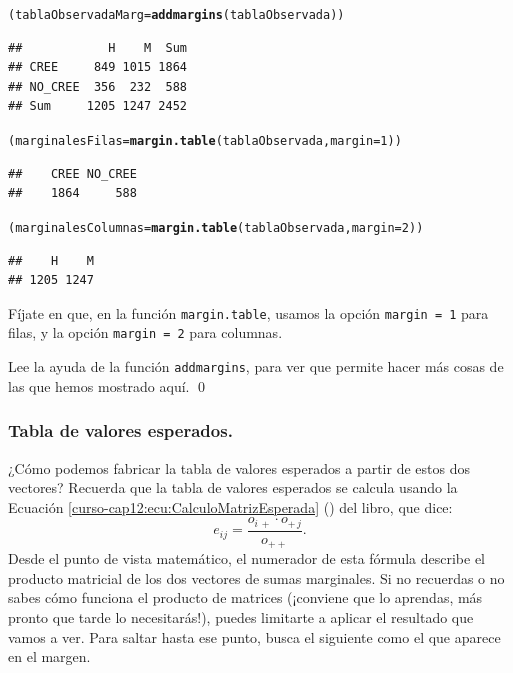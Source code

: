 \documentclass[10pt,a4paper]{article}\usepackage[]{graphicx}\usepackage[]{color}
\makeatletter
\newcommand{\hlnum}[1]{\textcolor[rgb]{0.686,0.059,0.569}{#1}}%
\newcommand{\hlstd}[1]{\textcolor[rgb]{0.345,0.345,0.345}{#1}}%
\newcommand{\hlkwb}[1]{\textcolor[rgb]{0.69,0.353,0.396}{#1}}%
\newcommand{\hlkwc}[1]{\textcolor[rgb]{0.333,0.667,0.333}{#1}}%
\newcommand{\hlkwd}[1]{\textcolor[rgb]{0.737,0.353,0.396}{\textbf{#1}}}%
\newenvironment{kframe}{%
 \def\at@end@of@kframe{}%
 \ifinner\ifhmode%
  \def\at@end@of@kframe{\end{minipage}}%
  \begin{minipage}{\columnwidth}%
 \fi\fi%
 \def\FrameCommand##1{\hskip\@totalleftmargin \hskip-\fboxsep
 \colorbox{shadecolor}{##1}\hskip-\fboxsep
     \hskip-\linewidth \hskip-\@totalleftmargin \hskip\columnwidth}%
 \MakeFramed {\advance\hsize-\width
   \@totalleftmargin\z@ \linewidth\hsize
   \@setminipage}}%
 {\par\unskip\endMakeFramed%
 \at@end@of@kframe}
\newenvironment{knitrout}{}{} %
\makeatother
\begin{document}
\begin{knitrout}
\color{fgcolor}\begin{kframe}
\begin{alltt}
\hlstd{(tablaObservadaMarg} \hlkwb{=} \hlkwd{addmargins}\hlstd{(tablaObservada))}
\end{alltt}
\begin{verbatim}
##            H    M  Sum
## CREE     849 1015 1864
## NO_CREE  356  232  588
## Sum     1205 1247 2452
\end{verbatim}
\begin{alltt}
\hlstd{(marginalesFilas} \hlkwb{=} \hlkwd{margin.table}\hlstd{(tablaObservada,} \hlkwc{margin}\hlstd{=}\hlnum{1}\hlstd{) )}
\end{alltt}
\begin{verbatim}
##    CREE NO_CREE 
##    1864     588
\end{verbatim}
\begin{alltt}
\hlstd{(marginalesColumnas} \hlkwb{=} \hlkwd{margin.table}\hlstd{(tablaObservada,} \hlkwc{margin}\hlstd{=}\hlnum{2}\hlstd{) )}
\end{alltt}
\begin{verbatim}
##    H    M 
## 1205 1247
\end{verbatim}
\end{kframe}
\end{knitrout}
Fíjate en que, en la función {\tt margin.table}, usamos la opción {\tt margin = 1} para filas, y la opción {\tt margin = 2} para columnas.

\begin{ejercicio}
\label{tut12:ejercicio01}
Lee la ayuda de la función {\tt addmargins}, para ver que permite hacer más cosas de las que hemos mostrado aquí.
\qed
\end{ejercicio}

\subsubsection*{Tabla de valores esperados.}
\label{tut12:subsubsec:TablaValoresEsperados}

¿Cómo podemos fabricar la tabla de valores esperados a partir de estos dos vectores? Recuerda que la tabla de valores esperados se calcula usando la Ecuación
\ref{curso-cap12:ecu:CalculoMatrizEsperada} (\pageref{curso-cap12:ecu:CalculoMatrizEsperada}) del
libro, que dice:
    \[e_{ij}=\dfrac{o_{i\,+}\cdot o_{+\,j}}{o_{++}}.\]
Desde el punto de vista matemático, el numerador de esta fórmula describe el producto matricial de los dos vectores de sumas marginales. Si no recuerdas o no sabes cómo funciona el producto de matrices (¡conviene que lo aprendas, más pronto que tarde lo necesitarás!), puedes limitarte a aplicar el resultado que vamos a ver. Para saltar hasta ese punto, busca el siguiente  como el que aparece en el margen.
\end{document}
